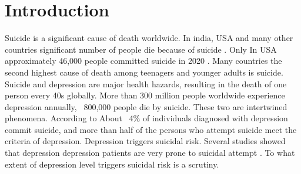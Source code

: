 \documentclass[sn-mathphys,Numbered]{sn-jnl}%
\theoremstyle{thmstyleone}%
\theoremstyle{thmstyletwo}%
\theoremstyle{thmstylethree}%
\begin{document}
\section{Introduction}\label{sec1}
Suicide is a significant cause of death worldwide. In india, USA and many other countries significant number of people die because of suicide \cite{havigerova2019text, singh2022startling}. Only In USA approximately 46,000 people committed suicide in 2020 \cite{singh2022startling}. Many countries the second highest cause of death among teenagers and younger adults is suicide. Suicide and depression are major health hazards, resulting in the death of one person every 40s globally. More than 300 million people worldwide experience depression annually, ~800,000 people die by suicide. These two are intertwined phenomena. According to \cite{singh2022startling} About ~4\% of individuals diagnosed with depression commit suicide, and more than half of the persons who attempt suicide meet the criteria of depression. Depression triggers suicidal risk. Several studies showed that depression depression patients are very prone to suicidal attempt \cite{vuorilehto2006suicidal, mcgirr2007examination, hawton2013risk}. To what extent of depression level triggers suicidal risk is a scrutiny. 
\end{document}
